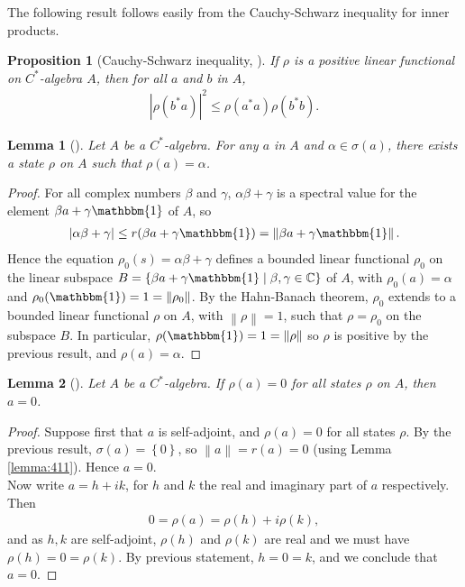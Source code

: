 \documentclass[11pt,a4paper]{report}
\theoremstyle{plain}
\newtheorem{lemma}{Lemma}
\newtheorem*{prop*}{Proposition}
\theoremstyle{definition}
\newcommand{\1}{\mathbbm{1}}
\newcommand{\C}{\mathbb{C}}
\newcommand{\spec}[1]{\sigma(#1)}
\begin{document}
The following result follows easily from the Cauchy-Schwarz inequality for inner products.
\begin{prop*}[Cauchy-Schwarz inequality, {\cite[4.3.1]{kadison83}}]
	If $\rho$ is a positive linear functional on $C^\ast$-algebra $A$, then for all $a$ and $b$ in $A$,
	\begin{align*}
		|\rho(b^\ast a)|^2 \leq \rho(a^\ast a)\rho(b^\ast b).
	\end{align*}
\end{prop*}


\begin{lemma}[{\cite[4.3.3]{kadison83}}]\label{lemma:433}
	Let $A$ be a $C^\ast$-algebra. For any $a$ in $A$ and $\alpha\in\spec{a}$, there exists a state
	$\rho$ on $A$ such that $\rho(a)=\alpha$.
\end{lemma}
\begin{proof}
	For all complex numbers $\beta$ and $\gamma$, $\alpha\beta+\gamma$ is a spectral value for the 
	element $\beta a+\gamma\1$ of $A$, so 
	\begin{align*}
		|\alpha\beta+\gamma|\leq r(\beta a+\gamma\1)=\left\|\beta a+\gamma\1\right\|.
	\end{align*} 
	Hence the equation $\rho_0(s)=\alpha\beta+\gamma$ defines a bounded linear functional
	$\rho_0$ on the linear subspace $B= \left\{\beta a+\gamma\1 \mid \beta,\gamma\in\C\right\}$ of $A$, with 
	$\rho_0(a) =\alpha$ and $\rho_0(\1)=1=\left\|\rho_0\right\|$. By the Hahn-Banach theorem, 
	$\rho_0$ extends to a bounded linear functional $\rho$ on $A$, with $\left\|\rho\right\|=1$, such that 
	$\rho=\rho_0$ on the subspace $B$. In particular, $\rho(\1)=1=\left\|\rho\right\|$ so $\rho$ is positive by 
	the previous result, and $\rho(a)=\alpha$.
\end{proof}

\begin{lemma}[{\cite[4.3.4,(i)]{kadison83}}]\label{lemma:state1}
	Let $A$ be a $C^\ast$-algebra. If $\rho(a)=0$ for all states $\rho$ on $A$, then $a=0$.
\end{lemma}
\begin{proof}
	Suppose first that $a$ is self-adjoint, and $\rho(a)=0$ for all states $\rho$. By the previous
	result, $\spec{a}=\left\{0\right\}$, so $\left\|a\right\|=r(a)=0$ (using Lemma \ref{lemma:411}). Hence $a=0$.			\\
	Now write $a=h+ik$, for $h$ and $k$ the real and imaginary part of $a$ respectively. Then
	\begin{align*}
		0=\rho(a)=\rho(h)+i\rho(k),
	\end{align*}
	and as $h,k$ are self-adjoint, $\rho(h)$ and $\rho(k)$ are real and we must have 
	$\rho(h)=0=\rho(k)$. By previous statement, $h=0=k$, and we conclude that $a=0$.
\end{proof}
\end{document}
